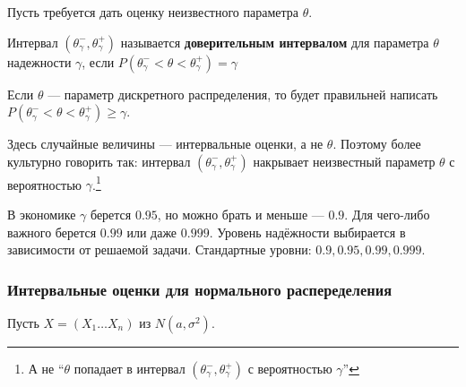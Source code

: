 Пусть требуется дать оценку неизвестного параметра \(\theta\).
\begin{definition}
    Интервал \((\theta^-_\gamma , \theta^+_\gamma)\) называется \textbf{доверительным интервалом} для параметра \(\theta\) надежности \(\gamma\), если \(P(\theta^-_\gamma < \theta < \theta^+_\gamma) = \gamma\)
\end{definition}
\begin{remark}
    Если \(\theta\) --- параметр дискретного распределения, то будет правильней написать \(P(\theta^-_\gamma < \theta < \theta^+_\gamma) \geq \gamma\).
\end{remark}
\begin{remark}
    Здесь случайные величины --- интервальные оценки, а не \(\theta\). Поэтому более культурно говорить так: интервал \((\theta^-_\gamma, \theta^+_\gamma)\) накрывает неизвестный параметр \(\theta\) с вероятностью \(\gamma\).\footnote{А не ``\(\theta\) попадает в интервал \((\theta^-_\gamma, \theta^+_\gamma)\) с вероятностью \(\gamma\)''}
\end{remark}
\begin{remark}
    В экономике \(\gamma\) берется \(0.95\), но можно брать и меньше --- \(0.9\). Для чего-либо важного берется \(0.99\) или даже \(0.999\). Уровень надёжности выбирается в зависимости от решаемой задачи. Стандартные уровни: \(0.9, 0.95, 0.99, 0.999\).
\end{remark}

\subsubsection{Интервальные оценки для нормального распеределения}

Пусть \(X = (X_1 \dots X_n)\) из \(N(a, \sigma^2)\).

